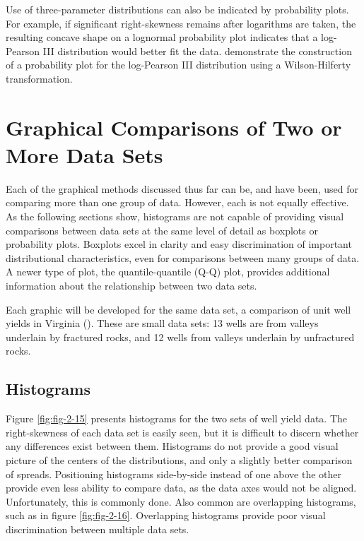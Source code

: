 \documentclass[]{book}
\begin{document}
Use of three-parameter distributions can also be indicated by probability plots. For example, if significant right-skewness remains after logarithms are taken, the resulting concave shape on a lognormal probability plot indicates that a log-Pearson III distribution would better fit the data. \citet{vogel_low_1989} demonstrate the construction of a probability plot for the log-Pearson III distribution using a Wilson-Hilferty transformation.

\hypertarget{ch2-2}{%
\section{Graphical Comparisons of Two or More Data Sets}\label{ch2-2}}

Each of the graphical methods discussed thus far can be, and have been, used for comparing more than one group of data. However, each is not equally effective. As the following sections show, histograms are not capable of providing visual comparisons between data sets at the same level of detail as boxplots or probability plots. Boxplots excel in clarity and easy discrimination of important distributional characteristics, even for comparisons between many groups of data. A newer type of plot, the quantile-quantile (Q-Q) plot, provides additional information about the relationship between two data sets.

Each graphic will be developed for the same data set, a comparison of unit well yields in Virginia (\citet{wright_effects_1985}). These are small data sets: 13 wells are from valleys underlain by fractured rocks, and 12 wells from valleys underlain by unfractured rocks.

\hypertarget{histograms-1}{%
\subsection{Histograms}\label{histograms-1}}

Figure \ref{fig:fig-2-15} presents histograms for the two sets of well yield data. The right-skewness of each data set is easily seen, but it is difficult to discern whether any differences exist between them. Histograms do not provide a good visual picture of the centers of the distributions, and only a slightly better comparison of spreads. Positioning histograms side-by-side instead of one above the other provide even less ability to compare data, as the data axes would not be aligned. Unfortunately, this is commonly done. Also common are overlapping histograms, such as in figure \ref{fig:fig-2-16}. Overlapping histograms provide poor visual discrimination between multiple data sets.
\end{document}
